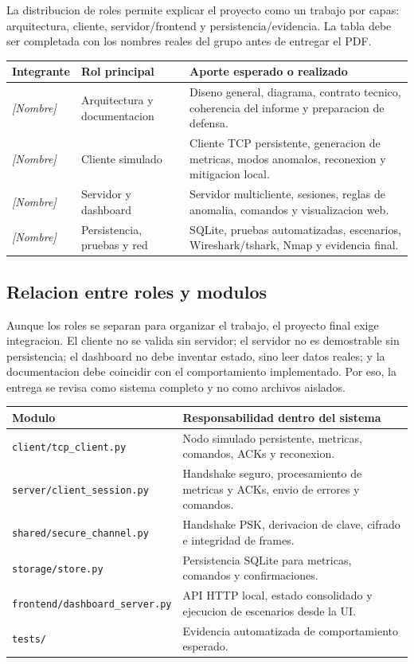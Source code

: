 \documentclass[11pt,letterpaper]{article}
\begin{document}
La distribucion de roles permite explicar el proyecto como un trabajo por capas:
arquitectura, cliente, servidor/frontend y persistencia/evidencia. La tabla debe
ser completada con los nombres reales del grupo antes de entregar el PDF.

\begin{longtable}{|p{}|p{}|p{}|}
\hline
\textbf{Integrante} & \textbf{Rol principal} & \textbf{Aporte esperado o realizado} \\
\hline
\textit{[Nombre]} & Arquitectura y documentacion & Diseno general, diagrama, contrato tecnico, coherencia del informe y preparacion de defensa. \\
\hline
\textit{[Nombre]} & Cliente simulado & Cliente TCP persistente, generacion de metricas, modos anomalos, reconexion y mitigacion local. \\
\hline
\textit{[Nombre]} & Servidor y dashboard & Servidor multicliente, sesiones, reglas de anomalia, comandos y visualizacion web. \\
\hline
\textit{[Nombre]} & Persistencia, pruebas y red & SQLite, pruebas automatizadas, escenarios, Wireshark/tshark, Nmap y evidencia final. \\
\hline
\end{longtable}

\subsection{Relacion entre roles y modulos}

Aunque los roles se separan para organizar el trabajo, el proyecto final exige
integracion. El cliente no se valida sin servidor; el servidor no es demostrable
sin persistencia; el dashboard no debe inventar estado, sino leer datos reales; y
la documentacion debe coincidir con el comportamiento implementado. Por eso, la
entrega se revisa como sistema completo y no como archivos aislados.

\begin{longtable}{|p{}|p{}|}
\hline
\textbf{Modulo} & \textbf{Responsabilidad dentro del sistema} \\
\hline
\texttt{client/tcp\_client.py} & Nodo simulado persistente, metricas, comandos, ACKs y reconexion. \\
\hline
\texttt{server/client\_session.py} & Handshake seguro, procesamiento de metricas y ACKs, envio de errores y comandos. \\
\hline
\texttt{shared/secure\_channel.py} & Handshake PSK, derivacion de clave, cifrado e integridad de frames. \\
\hline
\texttt{storage/store.py} & Persistencia SQLite para metricas, comandos y confirmaciones. \\
\hline
\texttt{frontend/dashboard\_server.py} & API HTTP local, estado consolidado y ejecucion de escenarios desde la UI. \\
\hline
\texttt{tests/} & Evidencia automatizada de comportamiento esperado. \\
\hline
\end{longtable}
\end{document}
